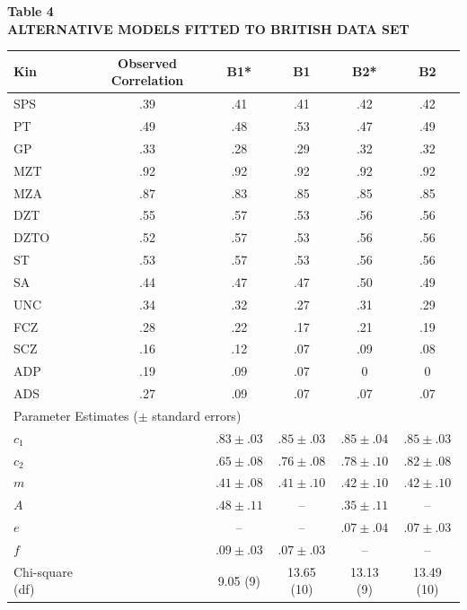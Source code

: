 ﻿\documentclass[12pt]{article}
\begin{document}
\begin{center}
\textbf{Table 4}\\
\textbf{ALTERNATIVE MODELS FITTED TO BRITISH DATA SET}
\end{center}
\begin{center}
\small
\begin{tabular}{l c c c c c}
\hline
Kin & Observed Correlation & B1* & B1 & B2* & B2 \\
\hline
SPS & .39 & .41 & .41 & .42 & .42 \\
PT & .49 & .48 & .53 & .47 & .49 \\
GP & .33 & .28 & .29 & .32 & .32 \\
MZT & .92 & .92 & .92 & .92 & .92 \\
MZA & .87 & .83 & .85 & .85 & .85 \\
DZT & .55 & .57 & .53 & .56 & .56 \\
DZTO & .52 & .57 & .53 & .56 & .56 \\
ST & .53 & .57 & .53 & .56 & .56 \\
SA & .44 & .47 & .47 & .50 & .49 \\
UNC & .34 & .32 & .27 & .31 & .29 \\
FCZ & .28 & .22 & .17 & .21 & .19 \\
SCZ & .16 & .12 & .07 & .09 & .08 \\
ADP & .19 & .09 & .07 & 0 & 0 \\
ADS & .27 & .09 & .07 & .07 & .07 \\
\hline
\multicolumn{6}{l}{Parameter Estimates ($\pm$ standard errors)} \\
\hline
$c_1$ & & $.83\pm.03$ & $.85\pm.03$ & $.85\pm.04$ & $.85\pm.03$ \\
$c_2$ & & $.65\pm.08$ & $.76\pm.08$ & $.78\pm.10$ & $.82\pm.08$ \\
$m$ & & $.41\pm.08$ & $.41\pm.10$ & $.42\pm.10$ & $.42\pm.10$ \\
$A$ & & $.48\pm.11$ & -- & $.35\pm.11$ & -- \\
$e$ & & -- & -- & $.07\pm.04$ & $.07\pm.03$ \\
$f$ & & $.09\pm.03$ & $.07\pm.03$ & -- & -- \\
\hline
Chi-square (df) & & 9.05 (9) & 13.65 (10) & 13.13 (9) & 13.49 (10) \\
\hline
\end{tabular}
\end{center}
\end{document}
